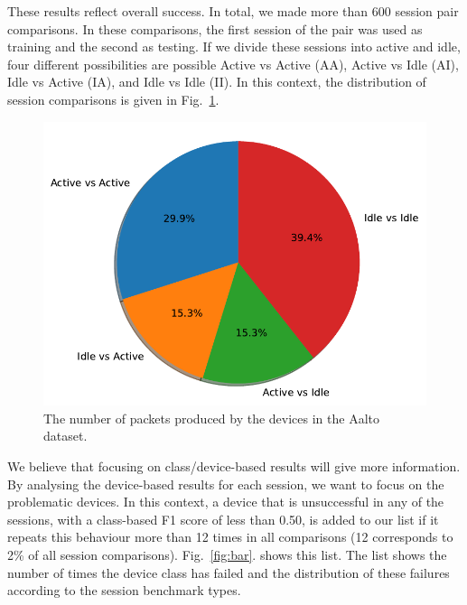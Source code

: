\documentclass[journal]{IEEEtran}
\begin{document}
These results reflect overall success. In total, we made more than 600 session pair comparisons. In these comparisons, the first session of the pair was used as training and the second as testing. If we divide these sessions into active and idle, four different possibilities are possible Active vs Active  (AA), Active vs Idle  (AI), Idle vs Active  (IA), and  Idle vs Idle  (II). In this context, the distribution of session comparisons is given in Fig.~\ref{fig:pie}.  
\begin{figure}[ht]
	\centerline{\includegraphics[width=0.61\columnwidth]{images/pie.pdf}}
	\caption{The number of packets produced by the devices in the Aalto dataset.}
	\label{fig:pie}
\end{figure}


We believe that focusing on class/device-based results will give more information. By analysing the device-based results for each session, we want to focus on the problematic devices. In this context, a device that is unsuccessful in any of the sessions, with a class-based F1 score of less than 0.50, is added to our list if it repeats this behaviour more than 12 times in all comparisons (12 corresponds to 2\% of all session comparisons). Fig.~\ref{fig:bar}.  shows this list. The list shows the number of times the device class has failed and the distribution of these failures according to the session benchmark types.
\end{document}
